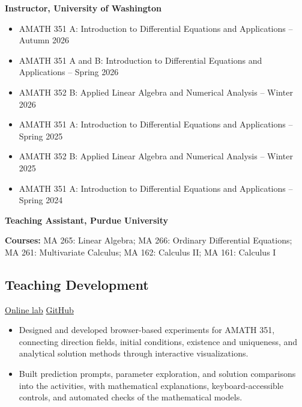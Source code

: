 \textbf{Instructor, University of Washington}
\begin{itemize}
  \item AMATH 351 A: Introduction to Differential Equations and Applications -- Autumn 2026
  \item AMATH 351 A and B: Introduction to Differential Equations and Applications -- Spring 2026
  \item AMATH 352 B: Applied Linear Algebra and Numerical Analysis -- Winter 2026
  \item AMATH 351 A: Introduction to Differential Equations and Applications -- Spring 2025
  \item AMATH 352 B: Applied Linear Algebra and Numerical Analysis -- Winter 2025
  \item AMATH 351 A: Introduction to Differential Equations and Applications -- Spring 2024
\end{itemize}

\textbf{Teaching Assistant, Purdue University}

\textbf{Courses:} MA 265: Linear Algebra; MA 266: Ordinary Differential Equations; MA 261: Multivariate Calculus; MA 162: Calculus II; MA 161: Calculus I

\subsection*{Teaching Development}
\href{https://shzhang3.github.io/amath351-lab/}{Online lab} \textbar{}
\href{https://github.com/shzhang3/amath351-lab}{GitHub}
\begin{itemize}
  \item Designed and developed browser-based experiments for AMATH 351, connecting direction fields, initial conditions, existence and uniqueness, and analytical solution methods through interactive visualizations.
  \item Built prediction prompts, parameter exploration, and solution comparisons into the activities, with mathematical explanations, keyboard-accessible controls, and automated checks of the mathematical models.
\end{itemize}
